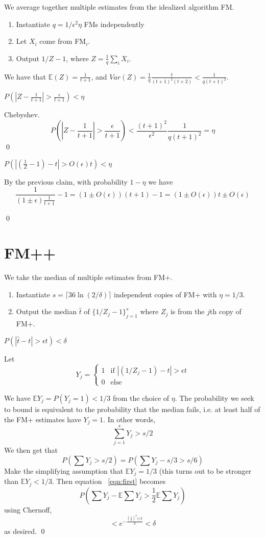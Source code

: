 \documentclass[11pt]{article}
\begin{document}
We average together multiple estimates from the idealized algorithm FM.

\begin{enumerate}
\item Instantiate $q = 1/\epsilon^2\eta$ FMs independently
\item Let $X_i$ come from FM$_i$.
\item Output $1/Z - 1$, where $Z = \frac1q \sum_i X_i$.
\end{enumerate}

We have that $\mathbb E(Z) = \frac{1}{t+1}$, and $Var(Z) = \frac 1q \frac{t}{(t+1)^2(t+2)} < \frac{1}{q(t+1)^2}$.

\claim $P(|Z - \frac{1}{t+1}| > \frac{\epsilon}{t+1}) < \eta$

\proof Chebyshev.
$$P(|Z - \frac{1}{t+1}| > \frac{\epsilon}{t+1}) < \frac{(t+1)^2}{\epsilon^2} \frac{1}{q(t+1)^2} = \eta$$ \qed

\claim $P(| (\frac{1}{Z} - 1) - t | > O(\epsilon)t) < \eta$

\proof By the previous claim, with probability $1- \eta$ we have
$$\frac{1}{(1 \pm \epsilon) \frac{1}{t+1}} - 1 = (1 \pm O(\epsilon))(t+1) - 1 = (1 \pm O(\epsilon))t \pm O(\epsilon)$$

\qed

\section{FM++}

We take the median of multiple estimates from FM+.

\begin{enumerate}
\item Instantiate $s = \lceil 36 \ln (2 / \delta) \rceil$ independent copies of FM+ with $\eta = 1/3$.
\item Output the median $\widehat{t}$ of $\{ 1/Z_j - 1 \}_{j=1}^s$ where $Z_j$ is from the $j$th copy of FM+.
\end{enumerate}

\claim $P(|\widehat{t} - t| > \epsilon t) < \delta$

\proof Let
$$Y_j = \begin{cases} 1 & \mbox{if } |(1/Z_j - 1) - t| > \epsilon t \\ 0 & \mbox{else} \end{cases}$$

We have $\mathbb E Y_j = P(Y_j = 1) < 1/3$ from the choice of $\eta$. The probability we seek to bound is equivalent to the probability that the median fails, i.e. at least half of the FM+ estimates have $Y_j = 1$. In other words,
$$\sum_{j=1}^s Y_j > s/2$$
We then get that
\begin{equation}
P(\sum Y_j > s/2) = P(\sum Y_j - s/3 > s/6) \label{eqn:first}
\end{equation}
Make the simplifying assumption that $\mathbb E Y_j = 1/3$ (this turns out to be stronger than $\mathbb E Y_j < 1/3$. Then equation ~\ref{eqn:first} becomes
$$P(\sum Y_j - \mathbb E \sum Y_j > \frac 12 \mathbb E \sum Y_j)$$
using Chernoff,
$$< e^{-\frac{(\frac12)^2  s/3}{3}} < \delta$$
as desired. \qed
\end{document}
